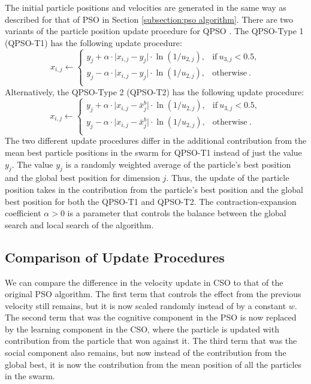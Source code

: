 \documentclass[12pt]{article}
\theoremstyle{definition}
\begin{document}
The initial particle positions and velocities are generated in the same way as described for that of PSO in Section \ref{subsection:pso algorithm}. There are two variants of the particle position update procedure for QPSO \cite{1460396, Sun2012ConvergenceAA}. The QPSO-Type 1 (QPSO-T1) has the following update procedure:
$$x_{i,j} \leftarrow 
\begin{cases}
y_j + \alpha \cdot \lvert x_{i,j} - y_j \rvert \cdot \ln{(1 / u_{2,j})}, & \text{if} \ u_{3,j} < 0.5, \\
y_j - \alpha \cdot \lvert x_{i,j} - y_j \rvert \cdot \ln{(1 / u_{2,j})}, & \text{otherwise} \ . \\
\end{cases}$$
Alternatively, the QPSO-Type 2 (QPSO-T2) has the following update procedure:
$$x_{i,j} \leftarrow 
\begin{cases}
y_j + \alpha \cdot \lvert x_{i,j} - \bar{x}^b_j \rvert \cdot \ln{(1 / u_{2,j})}, & \text{if} \ u_{3,j} < 0.5, \\
y_j - \alpha \cdot \lvert x_{i,j} - \bar{x}^b_j \rvert \cdot \ln{(1 / u_{2,j})}, & \text{otherwise} \ . \\
\end{cases}$$
The two different update procedures differ in the additional contribution from the mean best particle positions in the swarm for QPSO-T1 instead of just the value $y_j$. The value $y_j$ is a randomly weighted average of the particle's best position and the global best position for dimension $j$. Thus, the update of the particle position takes in the contribution from the particle's best position and the global best position for both the QPSO-T1 and QPSO-T2. The contraction-expansion coefficient $\alpha > 0$ is a parameter that controls the balance between the global search and local search of the algorithm.

\subsection{Comparison of Update Procedures}
We can compare the difference in the velocity update in CSO to that of the original PSO algorithm. The first term that controls the effect from the previous velocity still remains, but it is now scaled randomly instead of by a constant $w$. The second term that was the cognitive component in the PSO is now replaced by the learning component in the CSO, where the particle is updated with contribution from the particle that won against it. The third term that was the social component also remains, but now instead of the contribution from the global best, it is now the contribution from the mean position of all the particles in the swarm. \newline
\end{document}
